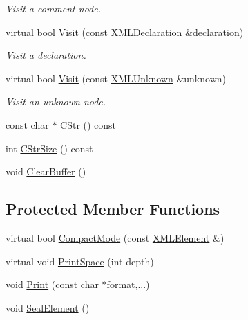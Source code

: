 \begin{DoxyCompactItemize}
\begin{DoxyCompactList}\small\item\em Visit a comment node. \end{DoxyCompactList}\item 
virtual bool \hyperlink{classtinyxml2_1_1_x_m_l_printer_acfc625b2549304b9c7eb85ebd5c5eb39}{Visit} (const \hyperlink{classtinyxml2_1_1_x_m_l_declaration}{X\-M\-L\-Declaration} \&declaration)
\begin{DoxyCompactList}\small\item\em Visit a declaration. \end{DoxyCompactList}\item 
virtual bool \hyperlink{classtinyxml2_1_1_x_m_l_printer_ab8af5455bbf9e4be2663e6642fcd7e32}{Visit} (const \hyperlink{classtinyxml2_1_1_x_m_l_unknown}{X\-M\-L\-Unknown} \&unknown)
\begin{DoxyCompactList}\small\item\em Visit an unknown node. \end{DoxyCompactList}\item 
const char $\ast$ \hyperlink{classtinyxml2_1_1_x_m_l_printer_a4a1b788e11b540921ec50687cd2b24a9}{C\-Str} () const 
\item 
int \hyperlink{classtinyxml2_1_1_x_m_l_printer_a02c3c5f8c6c007dcbaf10595d9e22bf0}{C\-Str\-Size} () const 
\item 
void \hyperlink{classtinyxml2_1_1_x_m_l_printer_a216157765b7267bf389975b1cbf9a909}{Clear\-Buffer} ()
\end{DoxyCompactItemize}
\subsection*{Protected Member Functions}
\begin{DoxyCompactItemize}
\item 
virtual bool \hyperlink{classtinyxml2_1_1_x_m_l_printer_a38e1ed5a779bdf63eda9e808f7a6de66}{Compact\-Mode} (const \hyperlink{classtinyxml2_1_1_x_m_l_element}{X\-M\-L\-Element} \&)
\item 
virtual void \hyperlink{classtinyxml2_1_1_x_m_l_printer_a1c4b2ccbe4fdb316d54f5a93f3559260}{Print\-Space} (int depth)
\item 
void \hyperlink{classtinyxml2_1_1_x_m_l_printer_ab30210a7f32e45634e7a45137bf6fdf6}{Print} (const char $\ast$format,...)
\item 
void \hyperlink{classtinyxml2_1_1_x_m_l_printer_a70ac2010150c8551773ffb2f96fef353}{Seal\-Element} ()
\end{DoxyCompactItemize}
